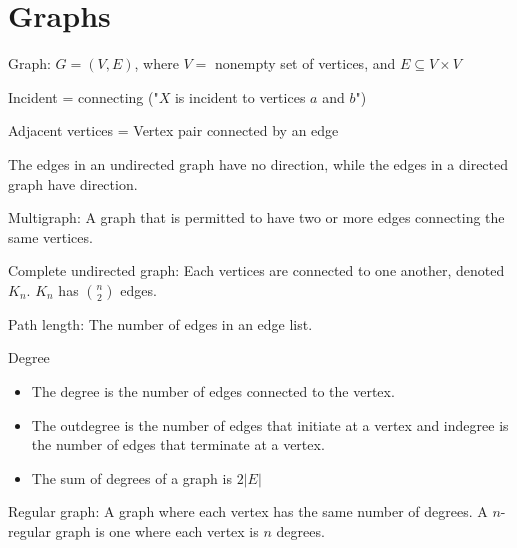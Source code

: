 \documentclass{article}
\begin{document}
\section{Graphs}

Graph: $G = (V, E)$, where $V =$ nonempty set of vertices, and $E \subseteq V \times V$

Incident = connecting ("$X$ is incident to vertices $a$ and $b$")

Adjacent vertices = Vertex pair connected by an edge

The edges in an undirected graph have no direction, while the edges in a directed graph have direction.

Multigraph: A graph that is permitted to have two or more edges connecting the same vertices.

Complete undirected graph: Each vertices are connected to one another, denoted $K_n$. $K_n$ has ${n \choose 2}$ edges.

Path length: The number of edges in an edge list.

\begin{center}
\end{center}

Degree
\begin{itemize}
    \item The degree is the number of edges connected to the vertex.
    \item The outdegree is the number of edges that initiate at a vertex and indegree is the number of edges that terminate at a vertex.
    \item The sum of degrees of a graph is $2|E|$
\end{itemize}

Regular graph: A graph where each vertex has the same number of degrees. A $n$-regular graph is one where each vertex is $n$ degrees.
\end{document}
